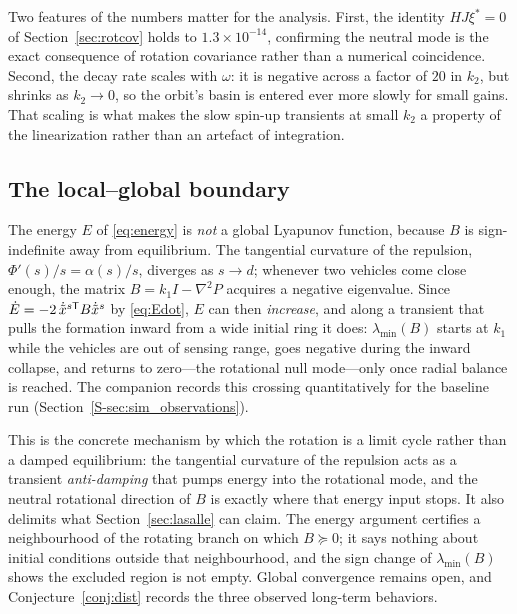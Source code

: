 Two features of the numbers matter for the analysis. First, the identity $HJ\xi^*=0$ of
Section~\ref{sec:rotcov} holds to $1.3\times10^{-14}$, confirming the neutral mode is the exact
consequence of rotation covariance rather than a numerical coincidence. Second, the decay rate scales
with $\omega$: it is negative across a factor of $20$ in $k_2$, but shrinks as $k_2\to0$, so the
orbit's basin is entered ever more slowly for small gains. That scaling is what makes the slow
spin-up transients at small $k_2$ a property of the linearization rather than an artefact of
integration.

\subsection{The local--global boundary}
\label{sec:localglobal}

The energy $E$ of \eqref{eq:energy} is \emph{not} a global Lyapunov function, because $B$ is
sign-indefinite away from equilibrium. The tangential curvature of the repulsion,
$\Phi'(s)/s=\alpha(s)/s$, diverges as $s\to d$; whenever two vehicles come close enough, the matrix
$B=k_1I-\nabla^2P$ acquires a negative eigenvalue. Since $\dot E=-2\,\dot{\tilde{x}}^{s\mathsf T}B\dot{\tilde{x}}^s$
by \eqref{eq:Edot}, $E$ can then \emph{increase}, and along a transient that pulls the formation
inward from a wide initial ring it does: $\lambda_{\min}(B)$ starts at $k_1$ while the vehicles are
out of sensing range, goes negative during the inward collapse, and returns to zero---the rotational
null mode---only once radial balance is reached. The companion records this crossing quantitatively
for the baseline run (Section~\ref{S-sec:sim_observations}).

This is the concrete mechanism by which the rotation is a limit cycle rather than a damped
equilibrium: the tangential curvature of the repulsion acts as a transient \emph{anti-damping} that
pumps energy into the rotational mode, and the neutral rotational direction of $B$ is exactly where
that energy input stops. It also delimits what Section~\ref{sec:lasalle} can claim. The energy
argument certifies a neighbourhood of the rotating branch on which $B\succeq0$; it says nothing about
initial conditions outside that neighbourhood, and the sign change of $\lambda_{\min}(B)$ shows the
excluded region is not empty. Global convergence remains open, and Conjecture~\ref{conj:dist}
records the three observed long-term behaviors.
